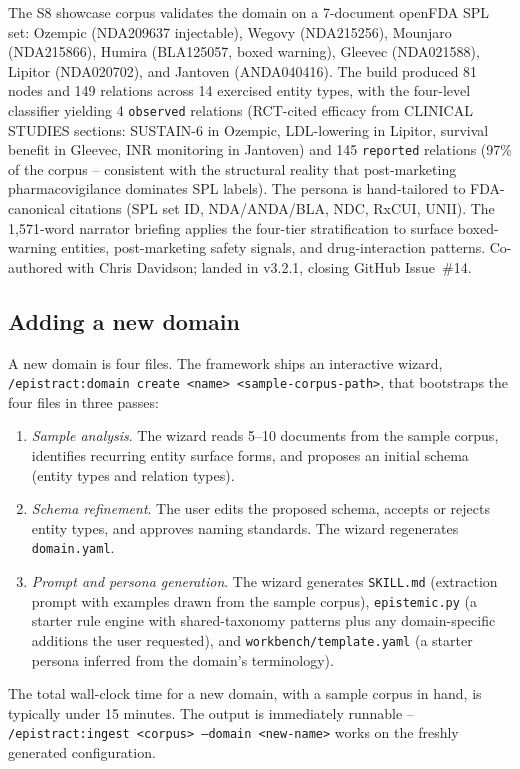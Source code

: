 The S8 showcase corpus validates the domain on a 7-document openFDA SPL set: Ozempic (NDA209637 injectable), Wegovy (NDA215256), Mounjaro (NDA215866), Humira (BLA125057, boxed warning), Gleevec (NDA021588), Lipitor (NDA020702), and Jantoven (ANDA040416). The build produced 81 nodes and 149 relations across 14 exercised entity types, with the four-level classifier yielding 4 \texttt{observed} relations (RCT-cited efficacy from CLINICAL STUDIES sections: SUSTAIN-6 in Ozempic, LDL-lowering in Lipitor, survival benefit in Gleevec, INR monitoring in Jantoven) and 145 \texttt{reported} relations (97\% of the corpus -- consistent with the structural reality that post-marketing pharmacovigilance dominates SPL labels). The persona is hand-tailored to FDA-canonical citations (SPL set ID, NDA/ANDA/BLA, NDC, RxCUI, UNII). The 1{,}571-word narrator briefing applies the four-tier stratification to surface boxed-warning entities, post-marketing safety signals, and drug-interaction patterns. Co-authored with Chris Davidson; landed in v3.2.1, closing GitHub Issue~\#14.

\subsection{Adding a new domain}

A new domain is four files. The framework ships an interactive wizard, \texttt{/epistract:domain create <name> <sample-corpus-path>}, that bootstraps the four files in three passes:

\begin{enumerate}
\item \emph{Sample analysis}. The wizard reads 5--10 documents from the sample corpus, identifies recurring entity surface forms, and proposes an initial schema (entity types and relation types).
\item \emph{Schema refinement}. The user edits the proposed schema, accepts or rejects entity types, and approves naming standards. The wizard regenerates \texttt{domain.yaml}.
\item \emph{Prompt and persona generation}. The wizard generates \texttt{SKILL.md} (extraction prompt with examples drawn from the sample corpus), \texttt{epistemic.py} (a starter rule engine with shared-taxonomy patterns plus any domain-specific additions the user requested), and \texttt{workbench/template.yaml} (a starter persona inferred from the domain's terminology).
\end{enumerate}

The total wall-clock time for a new domain, with a sample corpus in hand, is typically under 15 minutes. The output is immediately runnable -- \texttt{/epistract:ingest <corpus> --domain <new-name>} works on the freshly generated configuration.

